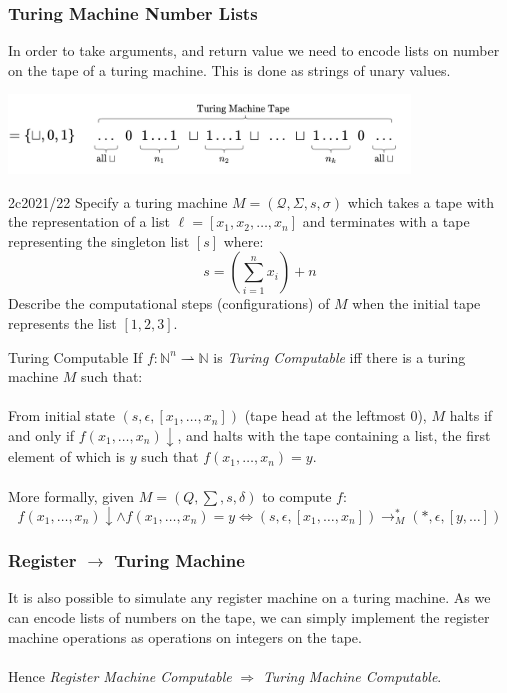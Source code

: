 \subsubsection{Turing Machine Number Lists}
In order to take arguments, and return value we need to encode lists on number on the tape of a turing machine. This is done as strings of unary values.
\begin{center}
    \includegraphics[width=0.8\textwidth]{turing_machines/images/turing_tape_list.drawio.png}
\end{center}

\begin{exambox}{2c}{2021/22}
	Specify a turing machine $M = (\mathcal{Q}, \Sigma, s, \sigma)$ which takes a tape with the representation of a list $\ell = [x_1, x_2, \dots, x_n]$ and terminates with a tape representing the singleton list $[s]$ where:
	\[s = \left( \sum_{i=1}^n x_i \right) + n\]
	Describe the computational steps (configurations) of $M$ when the initial tape represents the list $[1,2,3]$.
\end{exambox}

\begin{definitionbox}{Turing Computable}
	If $f: \mathbb{N}^n  \rightharpoonup \mathbb{N}$ is \textit{Turing Computable} iff there is a turing machine $M$ such that:
	\\
	\\ From initial state $(s, \epsilon, [x_1, \dots, x_n])$ (tape head at the leftmost $0$), $M$ halts if and only if $f(x_1, \dots, x_n)\downarrow$, and halts with the tape containing a list, the first element of which is $y$ such that $f(x_1, \dots, x_n) = y$.
	\\
	\\ More formally, given $M = (Q, \sum, s, \delta)$ to compute $f$:
	\[f(x_1, \dots, x_n)\downarrow \land f(x_1, \dots, x_n)=y \Leftrightarrow(s,\epsilon, [x_1, \dots, x_n]) \to^*_M (*, \epsilon, [y, \dots])\]
\end{definitionbox}

\subsubsection{Register $\to$ Turing Machine}
It is also possible to simulate any register machine on a turing machine. As we can encode lists of numbers on the tape, we can simply implement the register machine operations as operations on integers on the tape.
\\
\\ Hence \textit{Register Machine Computable} $\Rightarrow$ \textit{Turing Machine Computable}.

